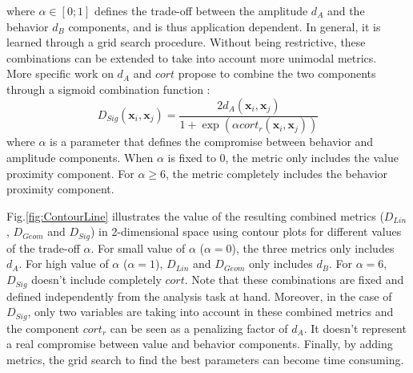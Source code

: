 \noindent where $\alpha \in [0;1]$ defines the trade-off between the amplitude $d_A$ and the behavior $d_B$ components, and is thus application dependent. In general, it is learned through a grid search procedure. Without being restrictive, these combinations can be extended to take into account more unimodal metrics. \\
More specific work on $d_A$ and $cort$ propose to combine the two components through a sigmoid combination function \cite{AhlameDouzal-Chouakria2011}:
\begin{equation}	
D_{Sig}(\textbf{x}_i,\textbf{x}_j) = \frac{2d_A(\textbf{x}_i,\textbf{x}_j)}{1+\exp(\alpha cort_r(\textbf{x}_i,\textbf{x}_j))}
\label{eq:DSig}
\end{equation}
\noindent where $\alpha$ is a parameter that defines the compromise between behavior and amplitude components. When $\alpha$ is fixed to 0, the metric only includes the value proximity component. For $\alpha \geq 6$, the metric completely includes the behavior proximity component. 

Fig.\ref{fig:ContourLine} illustrates the value of the resulting combined metrics ($D_{Lin}$, $D_{Geom}$ and $D_{Sig}$) in 2-dimensional space using contour plots for different values of the trade-off $\alpha$. For small value of $\alpha$ ($\alpha=0$), the three metrics only includes $d_A$. For high value of $\alpha$ ($\alpha=1$), $D_{Lin}$ and $D_{Geom}$ only includes $d_B$. For $\alpha=6$, $D_{Sig}$ doesn't include completely $cort$. Note that these combinations are fixed and defined independently from the analysis task at hand. Moreover, in the case of $D_{Sig}$, only two variables are taking into account in these combined metrics and the component $cort_r$ can be seen as a penalizing factor of $d_A$. It doesn't represent a real compromise between value and behavior components. Finally, by adding metrics, the grid search to find the best parameters can become time consuming.

